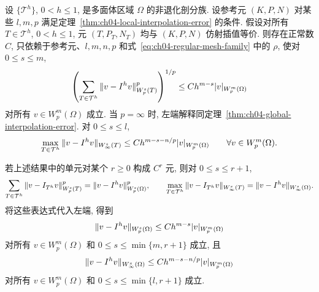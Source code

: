 \setcounter{thmcount}{23}
\begin{Corollary}
\label{cor:ch04-global-affine-interpolation-equivalent-error}
设 $\{\mathcal T^h\}$, $0<h\leq1$, 是多面体区域 $\Omega$ 的非退化剖分族. 设参考元 $(K,P,N)$ 对某些 $l,m,p$ 满足定理~\ref{thm:ch04-local-interpolation-error} 的条件. 假设对所有 $T\in\mathcal T^h$, $0<h\leq1$, 元 $(T,P_T,N_T)$ 均与 $(K,P,N)$ 仿射插值等价. 则存在正常数 $C$, 只依赖于参考元、$l,m,n,p$ 和式~\eqref{eq:ch04-regular-mesh-family} 中的 $\rho$, 使对 $0\leq s\leq m$,
\begin{equation}
\MathBookFormulaID{formula-ch04-affine-interpolation-equivalent-lp-error}
\label{eq:ch04-affine-interpolation-equivalent-lp-error}
\left(\sum_{T\in\mathcal T^h}\|v-I^h v\|_{W_p^s(T)}^p\right)^{1/p}
\leq Ch^{m-s}|v|_{W_p^m(\Omega)}
\end{equation}
对所有 $v\in W_p^m(\Omega)$ 成立. 当 $p=\infty$ 时, 左端解释同定理~\ref{thm:ch04-global-interpolation-error}. 对 $0\leq s\leq l$,
\begin{equation}
\MathBookFormulaID{formula-ch04-affine-interpolation-equivalent-linfty-error}
\label{eq:ch04-affine-interpolation-equivalent-linfty-error}
\max_{T\in\mathcal T^h}\|v-I^h v\|_{W_\infty^s(T)}
\leq Ch^{m-s-n/p}|v|_{W_p^m(\Omega)}
\qquad\forall v\in W_p^m(\Omega).
\end{equation}
\end{Corollary}

\setcounter{thmcount}{26}
\begin{Remark}
\label{rem:ch04-global-conforming-error}
若上述结果中的单元对某个 $r\geq0$ 构成 $C^r$ 元, 则对 $0\leq s\leq r+1$,
\[
\MathBookFormulaID{formula-ch04-global-conforming-norm-identities}
\sum_{T\in\mathcal T^h}\|v-I_{T^h}v\|_{W_p^s(T)}^p
=\|v-I^h v\|_{W_p^s(\Omega)}^p,
\qquad
\max_{T\in\mathcal T^h}\|v-I_{T^h}v\|_{W_\infty^s(T)}
=\|v-I^h v\|_{W_\infty^s(\Omega)}.
\]
将这些表达式代入左端, 得到
\begin{equation}
\MathBookFormulaID{formula-ch04-global-conforming-lp-error}
\label{eq:ch04-global-conforming-lp-error}
\|v-I^h v\|_{W_p^s(\Omega)}
\leq Ch^{m-s}|v|_{W_p^m(\Omega)}
\end{equation}
对所有 $v\in W_p^m(\Omega)$ 和 $0\leq s\leq\min\{m,r+1\}$ 成立, 且
\begin{equation}
\MathBookFormulaID{formula-ch04-global-conforming-linfty-error}
\label{eq:ch04-global-conforming-linfty-error}
\|v-I^h v\|_{W_\infty^s(\Omega)}
\leq Ch^{m-s-n/p}|v|_{W_p^m(\Omega)}
\end{equation}
对所有 $v\in W_p^m(\Omega)$ 和 $0\leq s\leq\min\{l,r+1\}$ 成立.
\end{Remark}

